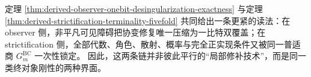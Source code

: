 \begin{remark}\label{rem:derived-observer-strictification-double-terminality}
定理 \ref{thm:derived-observer-onebit-desingularization-exactness} 与定理
\ref{thm:derived-strictification-terminality-fivefold}
共同给出一条更紧的读法：在 observer 侧，非平凡可见障碍把协变修复唯一压缩为一比特双覆盖；在 strictification 侧，全部代数、角色、散射、概率与完全正实现条件又被同一普适商 \(G_m^{\mathrm{BC}}\) 一次性锁定。
因此，这两条链并非彼此平行的“局部修补技术”，而是同一类终对象刚性的两种界面。
\end{remark}

\endinput
